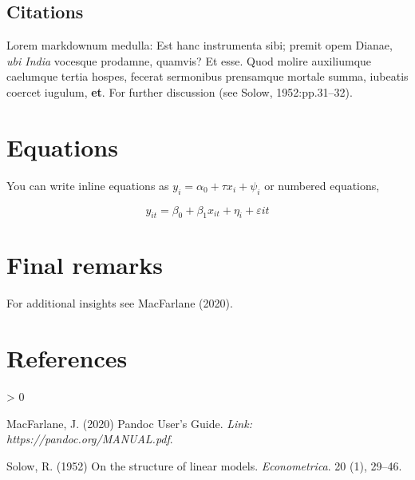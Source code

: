 \documentclass[
]{article}
\newlength{\cslhangindent}
\newenvironment{CSLReferences}[2] %
 {%
  \setlength{\parindent}{0pt}
  \ifodd #1 \everypar{\setlength{\hangindent}{\cslhangindent}}\ignorespaces\fi
  \ifnum #2 > 0
  \setlength{\parskip}{#2\baselineskip}
  \fi
 }%
 {}
\begin{document}
\hypertarget{citations}{%
\subsection{Citations}\label{citations}}

Lorem markdownum medulla: Est hanc instrumenta sibi; premit opem Dianae,
\emph{ubi India} vocesque prodamne, quamvis? Et esse. Quod molire
auxiliumque caelumque tertia hospes, fecerat sermonibus prensamque
mortale summa, iubeatis coercet iugulum, \textbf{et}. For further
discussion (see Solow, 1952:pp.31--32).

\hypertarget{equations}{%
\section{Equations}\label{equations}}

You can write inline equations as \(y_i = \alpha_0 + \tau x_i + \psi_i\)
or numbered equations,

\begin{equation}
y_{it} = \beta_0 + \beta_1 x_{it} + \eta_i + \varepsilon{it}
\end{equation}

\hypertarget{final-remarks}{%
\section{Final remarks}\label{final-remarks}}

For additional insights see MacFarlane (2020).

\hypertarget{references}{%
\section*{References}\label{references}}

\hypertarget{refs}{}
\begin{CSLReferences}{1}{0}
\leavevmode\hypertarget{ref-MacFarlane}{}%
MacFarlane, J. (2020) {Pandoc User's Guide}. \emph{Link:
https://pandoc.org/MANUAL.pdf}.

\leavevmode\hypertarget{ref-solow1952structure}{}%
Solow, R. (1952) On the structure of linear models. \emph{Econometrica}.
20 (1), 29--46.

\end{CSLReferences}
\end{document}
